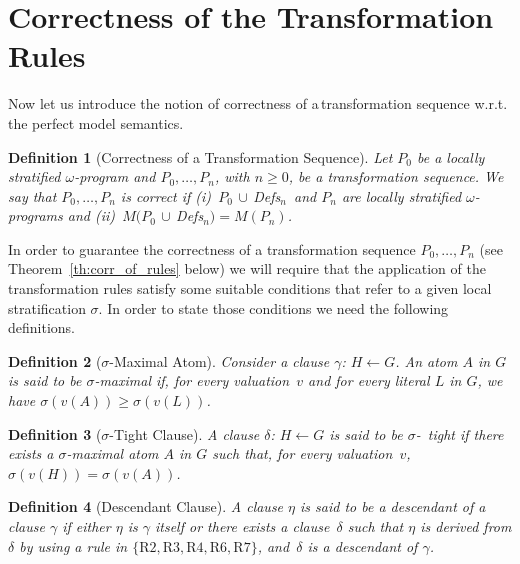 \documentclass[english]{tlp}
\newtheorem{definition}{Definition} \newtheorem{example}{Example}       \newtheorem{remark}{Remark}
\newcommand{\Mathit}[1]{\mbox{\it #1}}
\newcommand{\Defsn}{\Mathit{Defs}$_{n}$}
\begin{document}
\section{Correctness of the Transformation Rules}
\label{sec:corr_of_rules}

Now let us introduce the notion of correctness of a\,transformation
sequence w.r.t.\,the perfect model semantics.

\begin{definition}
[Correctness of a Transformation Sequence]
\label{def:correctness-of-transf-sequence} Let $P_{0}$ be a locally
stratified $\omega$-program and $P_{0},\ldots ,P_{n}$, with $n\!\geq\!0$,
 be a transformation
sequence. We say that $P_{0},\ldots ,P_{n}$ is {\em correct} if
(i)~$P_{0}\,\cup\,$\Defsn~and $P_n$ are locally stratified
$\omega$-programs and (ii)~$M(P_{0}\,\cup\,$\Defsn$)=M(P_n)$.
\end{definition}


In order to guarantee the correctness of a transformation sequence
$P_{0},\ldots ,P_{n}$ (see Theorem~\ref{th:corr_of_rules} below) we
will require that the application of the transformation rules
satisfy some suitable conditions that refer to a given local
stratification $\sigma$. In order to state those
conditions we need the following definitions.
\vspace{0mm}
 
\begin{definition}
[$\sigma$-Maximal Atom] \label{def:sigma-maximal} Consider a clause
$\gamma$: $H\leftarrow G$. An atom $A$ in $G$ is
said to be {\em $\sigma$-maximal} if, for every
valuation~$v$ and for every literal $L$ in $G$, we have
$\sigma(v(A))\!\geq \!\sigma(v(L))$.
\end{definition}
\vspace{-2mm}

\begin{definition}
[$\sigma$-Tight Clause]\label{def:sigma-tight-definition}
A clause $\delta$: $H\leftarrow G$ is said to be {\mbox{$\sigma$-{\em
tight}}} if there exists a $\sigma$-maximal atom $A$ in $G$
such that, for every valuation~$v$, $\sigma (v(H))\!=\!\sigma(v(A))$.
\end{definition}
\vspace{-2mm}

\begin{definition}
[Descendant Clause] \label{def:descen-clause-definition} A clause
$\eta$ is said to be a {\em descendant} of a clause $\gamma$ if
{\it{either}} $\eta$ is $\gamma$ itself {\it{or}} there exists a
clause~$\delta$ such that $\eta$ is {\it{derived from}} $\delta$ by
using a rule in $\{ \mbox{R2}, \mbox{R3}, \mbox{R4}, \mbox{R6},
\mbox{R7}\}$, and~$\delta$ is a descendant of $\gamma$.
\end{definition}
\vspace{-2mm}
\end{document}
